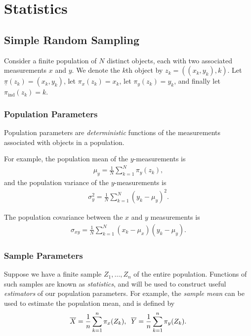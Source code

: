 \setchaptergraphic{}

\chapter{Statistics}
\label{ch:statistics}

\section{Simple Random Sampling}

Consider a finite population of $N$ distinct objects, each with two associated measurements $x$ and $y$. We denote the $k$th object by $z_k = ((x_k, y_k), k)$. Let $\underline{\pi}(z_k) = (x_k, y_k)$, let $\pi_x(z_k) = x_k$, let $\pi_y(z_k) = y_k$, and finally let $\pi_{\mathrm{ind}}(z_k) = k$.

\subsection{Population Parameters}

Population parameters are \emph{deterministic} functions of the measurements associated with objects in a population.

For example, the population mean of the $y$-measurements is
\begin{align*}
    \mu_y = \frac{1}{N}\sum_{k=1}^{N}\pi_{y}(z_k),
\end{align*}
and the population variance of the $y$-measurements is
\begin{align*}
    \sigma_{y}^2 = \frac{1}{N}\sum_{k=1}^{N}\left(y_k - \mu_y\right)^2.
\end{align*}

The population covariance between the $x$ and $y$ measurements is
\begin{align*}
    \sigma_{xy} = \frac{1}{N}\sum_{k=1}^{N}\left(x_k-\mu_x\right)\left(y_k-\mu_y\right).
\end{align*}

\subsection{Sample Parameters}

Suppose we have a finite sample $Z_1, \ldots, Z_n$ of the entire population. Functions of such samples are known as \emph{statistics}, and will be used to construct useful \emph{estimators} of our population parameters. For example, the \emph{sample mean} can be used to estimate the population mean, and is defined by
\begin{align*}
    \overline{X} = \frac{1}{n}\sum_{k=1}^{n}\pi_{x}(Z_k),\;\; \overline{Y} = \frac{1}{n}\sum_{k=1}^{n}\pi_{y}(Z_k).
\end{align*}

